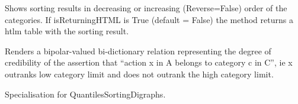 \documentclass[letterpaper,10pt,english]{sphinxmanual}
\begin{document}
\begin{fulllineitems}
\begin{fulllineitems}
\end{fulllineitems}


\begin{fulllineitems}
\label{techDoc:sortingDigraphs.QuantilesSortingDigraph.showSorting}
Shows sorting results in decreasing or increasing (Reverse=False)
order of the categories. If isReturningHTML is True (default = False)
the method returns a htlm table with the sorting result.

\end{fulllineitems}


\begin{fulllineitems}
\label{techDoc:sortingDigraphs.QuantilesSortingDigraph.showSortingCharacteristics}
Renders a bipolar-valued bi-dictionary relation
representing the degree of credibility of the
assertion that ``action x in A belongs to category c in C'',
ie x outranks low category limit and does not outrank
the high category limit.

\end{fulllineitems}


\begin{fulllineitems}
\label{techDoc:sortingDigraphs.QuantilesSortingDigraph.showWeakOrder}
Specialisation for QuantilesSortingDigraphs.

\end{fulllineitems}


\end{fulllineitems}

\end{document}
